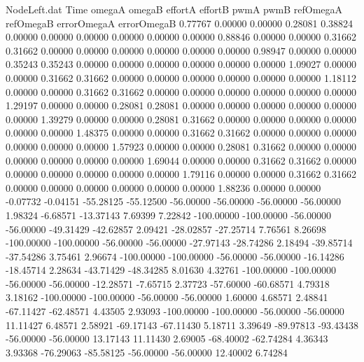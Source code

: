 \begin{filecontents}{NodeLeft.dat}
Time omegaA omegaB effortA effortB pwmA pwmB refOmegaA refOmegaB errorOmegaA errorOmegaB
   0.77767    0.00000    0.00000     0.28081    0.38824    0.00000    0.00000    0.00000    0.00000    0.00000    0.00000
   0.88846    0.00000    0.00000     0.31662    0.31662    0.00000    0.00000    0.00000    0.00000    0.00000    0.00000
   0.98947    0.00000    0.00000     0.35243    0.35243    0.00000    0.00000    0.00000    0.00000    0.00000    0.00000
   1.09027    0.00000    0.00000     0.31662    0.31662    0.00000    0.00000    0.00000    0.00000    0.00000    0.00000
   1.18112    0.00000    0.00000     0.31662    0.31662    0.00000    0.00000    0.00000    0.00000    0.00000    0.00000
   1.29197    0.00000    0.00000     0.28081    0.28081    0.00000    0.00000    0.00000    0.00000    0.00000    0.00000
   1.39279    0.00000    0.00000     0.28081    0.31662    0.00000    0.00000    0.00000    0.00000    0.00000    0.00000
   1.48375    0.00000    0.00000     0.31662    0.31662    0.00000    0.00000    0.00000    0.00000    0.00000    0.00000
   1.57923    0.00000    0.00000     0.28081    0.31662    0.00000    0.00000    0.00000    0.00000    0.00000    0.00000
   1.69044    0.00000    0.00000     0.31662    0.31662    0.00000    0.00000    0.00000    0.00000    0.00000    0.00000
   1.79116    0.00000    0.00000     0.31662    0.31662    0.00000    0.00000    0.00000    0.00000    0.00000    0.00000
   1.88236    0.00000    0.00000    -0.07732   -0.04151  -55.28125  -55.12500  -56.00000  -56.00000  -56.00000  -56.00000
   1.98324   -6.68571  -13.37143     7.69399    7.22842 -100.00000 -100.00000  -56.00000  -56.00000  -49.31429  -42.62857
   2.09421  -28.02857  -27.25714     7.76561    8.26698 -100.00000 -100.00000  -56.00000  -56.00000  -27.97143  -28.74286
   2.18494  -39.85714  -37.54286     3.75461    2.96674 -100.00000 -100.00000  -56.00000  -56.00000  -16.14286  -18.45714
   2.28634  -43.71429  -48.34285     8.01630    4.32761 -100.00000 -100.00000  -56.00000  -56.00000  -12.28571   -7.65715
   2.37723  -57.60000  -60.68571     4.79318    3.18162 -100.00000 -100.00000  -56.00000  -56.00000    1.60000    4.68571
   2.48841  -67.11427  -62.48571     4.43505    2.93093 -100.00000 -100.00000  -56.00000  -56.00000   11.11427    6.48571
   2.58921  -69.17143  -67.11430     5.18711    3.39649  -89.97813  -93.43438  -56.00000  -56.00000   13.17143   11.11430
   2.69005  -68.40002  -62.74284     4.36343    3.93368  -76.29063  -85.58125  -56.00000  -56.00000   12.40002    6.74284

\end{filecontents}

